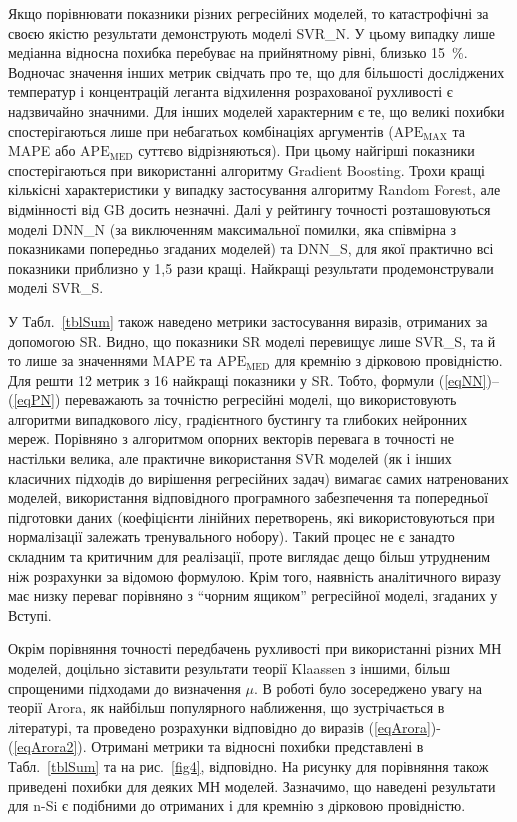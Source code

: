 \documentclass[fleqn,twoside,twocolumn,nofootinbib,showkeys]{revtex4} %
\begin{document}
Якщо порівнювати показники різних регресійних моделей, то
катастрофічні за своєю якістю результати демонструють моделі SVR\_N.
У цьому випадку лише медіанна відносна похибка перебуває на прийнятному рівні, близько 15~\%.
Водночас значення інших метрик свідчать про те, що для більшості досліджених температур і концентрацій леганта
відхилення розрахованої рухливості є надзвичайно значними.
Для інших моделей характерним є те, що великі похибки спостерігаються лише при небагатьох комбінаціях аргументів
($\mathrm{APE}_\mathrm{MAX}$ та MAPE або $\mathrm{APE}_\mathrm{MED}$ суттєво відрізняються).
При цьому найгірші показники спостерігаються при використанні алгоритму Gradient Boosting.
Трохи кращі кількісні характеристики у випадку застосування алгоритму Random Forest,
але відмінності від GB досить незначні.
Далі у рейтингу точності розташовуються моделі DNN\_N (за виключенням максимальної помилки, яка співмірна з
показниками попередньо згаданих моделей) та DNN\_S, для якої практично всі показники приблизно у 1,5 рази кращі.
Найкращі результати продемонстрували моделі SVR\_S.

У Табл.~\ref{tblSum} також наведено метрики застосування виразів, отриманих за допомогою SR.
Видно, що показники SR моделі перевищує лише SVR\_S, та й то лише
за значеннями MAPE та $\mathrm{APE}_\mathrm{MED}$ для кремнію з дірковою провідністю.
Для решти 12 метрик з 16 найкращі показники у SR.
Тобто, формули (\ref{eqNN})--(\ref{eqPN}) переважають за точністю регресійні моделі, що використовують алгоритми
випадкового лісу, градієнтного бустингу та глибоких нейронних мереж.
Порівняно з алгоритмом опорних векторів перевага в точності не настільки велика, але
практичне використання SVR моделей (як і інших класичних підходів до вирішення регресійних задач)
вимагає самих натренованих моделей, використання відповідного програмного забезпечення та попередньої підготовки даних
(коефіцієнти лінійних перетворень, які використовуються при нормалізації залежать тренувального нобору).
Такий процес не є занадто складним та критичним для реалізації, проте виглядає дещо більш утрудненим ніж розрахунки за відомою формулою.
Крім того, наявність аналітичного виразу має низку переваг порівняно з
``чорним ящиком'' регресійної моделі, згаданих у Вступі.

Окрім порівняння точності передбачень рухливості при використанні різних МН моделей,
доцільно зіставити результати теорії Klaassen з іншими, більш спрощеними підходами до визначення $\mu$.
В роботі було зосереджено увагу на теорії Arora, як найбільш популярного наближення, що зустрічається в літературі,
та проведено розрахунки відповідно до виразів (\ref{eqArora})-(\ref{eqArora2}).
Отримані метрики та відносні похибки представлені в Табл.~\ref{tblSum} та на рис.~\ref{fig4}, відповідно.
На рисунку для порівняння також приведені похибки для деяких МН моделей.
Зазначимо, що наведені результати для n-Si є подібними до отриманих і для кремнію з дірковою провідністю.
\end{document}
